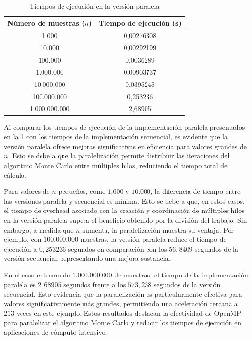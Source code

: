 \documentclass[a4paper, 10pt, onecolumn]{IEEEtran}
\begin{document}
\begin{table}[H]
	\centering
	\begin{tabular}{|c|c|}
		\hline
		\textbf{Número de muestras ($n$)} & \textbf{Tiempo de ejecución (s)} \\
		\hline
		1.000         & 0,00276308\\
		10.000        & 0,00292199 \\
		100.000       & 0,0036289 \\
		1.000.000     & 0,00903737 \\
		10.000.000    & 0,0395245 \\
		100.000.000   & 0,253236 \\
		1.000.000.000 & 2,68905 \\
		\hline
	\end{tabular}
	\caption{Tiempos de ejecución en la versión paralela}
	\label{tab:parallel_execution_times}
\end{table}

Al comparar los tiempos de ejecución de la implementación paralela presentados en la \cref{tab:parallel_execution_times} con los tiempos de la implementación secuencial, es evidente que la versión paralela ofrece mejoras significativas en eficiencia para valores grandes de $n$. Esto se debe a que la paralelización permite distribuir las iteraciones del algoritmo Monte Carlo entre múltiples hilos, reduciendo el tiempo total de cálculo.

Para valores de $n$ pequeños, como $1.000$ y $10.000$, la diferencia de tiempo entre las versiones paralela y secuencial es mínima. Esto se debe a que, en estos casos, el tiempo de overhead asociado con la creación y coordinación de múltiples hilos en la versión paralela supera el beneficio obtenido por la división del trabajo. Sin embargo, a medida que $n$ aumenta, la paralelización muestra su ventaja. Por ejemplo, con $100.000.000$ muestras, la versión paralela reduce el tiempo de ejecución a $0,253236$ segundos en comparación con los $56,8409$ segundos de la versión secuencial, representando una mejora sustancial.

En el caso extremo de $1.000.000.000$ de muestras, el tiempo de la implementación paralela es $2,68905$ segundos frente a los $573,238$ segundos de la versión secuencial. Esto evidencia que la paralelización es particularmente efectiva para valores significativamente más grandes, permitiendo una aceleración cercana a $213$ veces en este ejemplo. Estos resultados destacan la efectividad de OpenMP para paralelizar el algoritmo Monte Carlo y reducir los tiempos de ejecución en aplicaciones de cómputo intensivo.
\end{document}
